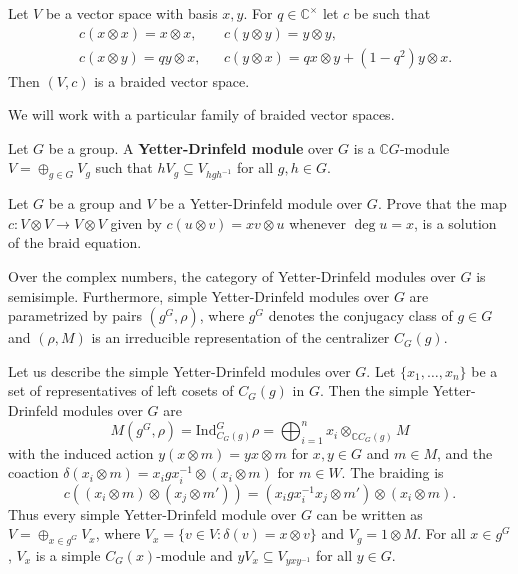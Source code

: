 \documentclass[graybox]{svmult}
\newcommand{\C}{\mathbb{C}}
\begin{document}
\begin{example}
	Let $V$ be a vector space with basis $x,y$. For $q\in\C^{\times}$ let $c$ be such that 
	\begin{align*}
		&c(x\otimes x)=x\otimes x, && 
		c(y\otimes y)=y\otimes y, \\
		&c(x\otimes y)=q y\otimes x, && 
		c(y\otimes x)=q x\otimes y+(1-q^2)y\otimes x.
	\end{align*}
	Then $(V,c)$ is a braided vector space.
\end{example}

We will work with a particular family of braided vector spaces.

\begin{definition}
	Let $G$ be a group. 
	A \textbf{Yetter-Drinfeld module} over $G$ is a $\C G$-module
	$V=\oplus_{g\in G}V_{g}$ such that $hV_{g}\subseteq V_{hgh^{-1}}$ for all
	$g,h\in G$. 
\end{definition}

\begin{exercise}
	Let $G$ be a group and $V$ be a Yetter-Drinfeld module over $G$. Prove that
	the map $c:V\otimes V\to V\otimes V$ given by  $c(u\otimes v)=xv\otimes u$
	whenever $\deg u=x$, is a solution of the braid equation.
\end{exercise}

Over the complex numbers, the category of Yetter-Drinfeld modules over $G$
is semisimple.  Furthermore, simple Yetter-Drinfeld modules over $G$ are
parametrized by pairs $(g^G,\rho)$, where $g^G$ denotes the conjugacy class of $g\in G$  
and $(\rho,M)$ is an irreducible representation of the centralizer
$C_G(g)$. 

Let us describe the simple Yetter-Drinfeld modules over $G$. Let $\{x_1,\dots,x_n\}$
be a set of representatives of left cosets of $C_G(g)$ in $G$.  Then the simple
Yetter-Drinfeld modules over $G$ are
\[
M(g^G,\rho)=\mathrm{Ind}_{C_G(g)}^G\rho=\bigoplus_{i=1}^n x_i\otimes_{\mathbb{C}C_G(g)}M
\]
with the induced action $y(x\otimes m)=yx\otimes m$ for $x,y\in G$ and $m\in
M$, and the coaction $\delta(x_i\otimes m)=x_igx_i^{-1}\otimes(x_i\otimes
m)$ for $m\in W$. The braiding is
\[
c\left((x_i\otimes m)\otimes(x_j\otimes m') \right)=(x_igx_i^{-1}x_j\otimes m')\otimes(x_i\otimes m).
\]
Thus every simple Yetter-Drinfeld module over $G$ can be written as
$V=\oplus_{x\in g^G}V_x$, where $V_x=\{v\in V:\delta(v)=x\otimes v\}$ and
$V_g=1\otimes M$. For all $x\in g^G$, $V_x$ is a simple $C_G(x)$-module and
$yV_x\subseteq V_{yxy^{-1}}$ for all $y\in G$.
\end{document}
